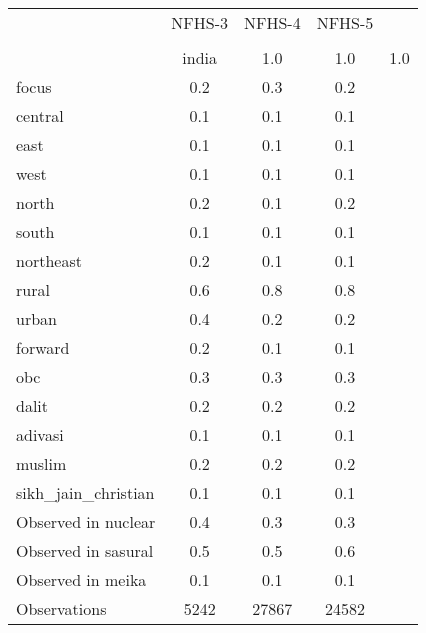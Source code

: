 {
\def\sym#1{\ifmmode^{#1}\else\(^{#1}\)\fi}
\begin{tabular}{l*{3}{c}}
\toprule
                    &      NFHS-3&      NFHS-4&      NFHS-5\\
                    &&&\\
                    & %
\midrule
india               &         1.0&         1.0&         1.0\\
focus               &         0.2&         0.3&         0.2\\
central             &         0.1&         0.1&         0.1\\
east                &         0.1&         0.1&         0.1\\
west                &         0.1&         0.1&         0.1\\
north               &         0.2&         0.1&         0.2\\
south               &         0.1&         0.1&         0.1\\
northeast           &         0.2&         0.1&         0.1\\
rural               &         0.6&         0.8&         0.8\\
urban               &         0.4&         0.2&         0.2\\
forward             &         0.2&         0.1&         0.1\\
obc                 &         0.3&         0.3&         0.3\\
dalit               &         0.2&         0.2&         0.2\\
adivasi             &         0.1&         0.1&         0.1\\
muslim              &         0.2&         0.2&         0.2\\
sikh\_jain\_christian &         0.1&         0.1&         0.1\\
Observed in nuclear &         0.4&         0.3&         0.3\\
Observed in sasural &         0.5&         0.5&         0.6\\
Observed in meika   &         0.1&         0.1&         0.1\\
\midrule
Observations        &        5242&       27867&       24582\\
\bottomrule
\end{tabular}
}
